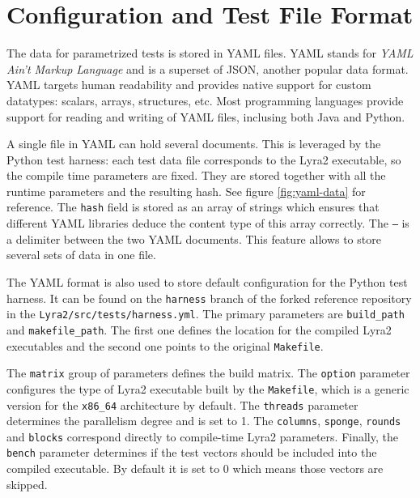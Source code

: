 \chapter{Configuration and Test File Format}

The data for parametrized tests is stored in YAML files. YAML stands for \emph{YAML Ain't Markup Language} and is a superset of JSON, another popular data format. YAML targets human readability and provides native support for custom datatypes: scalars, arrays, structures, etc. Most programming languages provide support for reading and writing of YAML files, inclusing both Java and Python.

A single file in YAML can hold several documents. This is leveraged by the Python test harness: each test data file corresponds to the Lyra2 executable, so the compile time parameters are fixed. They are stored together with all the runtime parameters and the resulting hash. See figure \ref{fig:yaml-data} for reference. The \texttt{hash} field is stored as an array of strings which ensures that different YAML libraries deduce the content type of this array correctly. The \texttt{---} is a delimiter between the two YAML documents. This feature allows to store several sets of data in one file.

The YAML format is also used to store default configuration for the Python test harness. It can be found on the \texttt{harness} branch of the forked reference repository \cite{github:2017:lyra-copy} in the \texttt{Lyra2/src/tests/harness.yml}. The primary parameters are \texttt{build_path} and \texttt{makefile_path}. The first one defines the location for the compiled Lyra2 executables and the second one points to the original \texttt{Makefile}.

The \texttt{matrix} group of parameters defines the build matrix. The \texttt{option} parameter configures the type of Lyra2 executable built by the \texttt{Makefile}, which is a generic version for the \texttt{x86_64} architecture by default. The \texttt{threads} parameter determines the parallelism degree and is set to 1. The \texttt{columns}, \texttt{sponge}, \texttt{rounds} and \texttt{blocks} correspond directly to compile-time Lyra2 parameters. Finally, the \texttt{bench} parameter determines if the test vectors should be included into the compiled executable. By default it is set to 0 which means those vectors are skipped.

